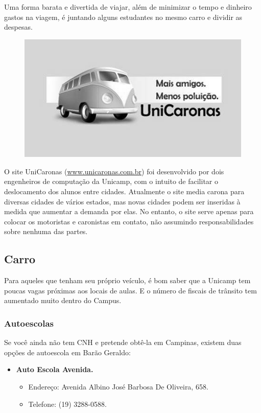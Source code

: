 Uma forma barata e divertida de viajar, além de minimizar o tempo e dinheiro
gastos na viagem, é juntando alguns estudantes no mesmo carro e dividir as
despesas.
\begin{figure}[h!]
    \centering
    \includegraphics[scale=0.55,keepaspectratio=true]{img/imgs/8-transporte/unicaronas.jpg}
\end{figure}


O site UniCaronas (\url{www.unicaronas.com.br})
foi desenvolvido por dois engenheiros de computação da Unicamp, com o intuito de facilitar o deslocamento
dos alunos entre cidades. Atualmente o site media carona para diversas cidades de vários estados, mas
novas cidades podem ser inseridas à medida que aumentar a demanda por elas. No entanto, o site serve apenas para colocar os motoristas
e caronistas em contato, não assumindo responsabilidades sobre nenhuma das
partes.

\subsection{Carro}

Para aqueles que tenham seu próprio veículo, é bom saber que a Unicamp tem
poucas vagas próximas aos locais de aulas. E o número de fiscais de trânsito tem
aumentado muito dentro do Campus.

\subsubsection{Autoescolas}

Se você ainda não tem CNH e pretende obtê-la em Campinas, existem duas opções de
autoescola em Barão Geraldo:

\begin{itemize}
\item  \textbf{Auto Escola Avenida.}
\begin{itemize}
\item  Endereço: Avenida Albino José Barbosa De Oliveira, 658.
\item  Telefone: (19) 3288-0588.
\end{itemize}
\end{itemize}

